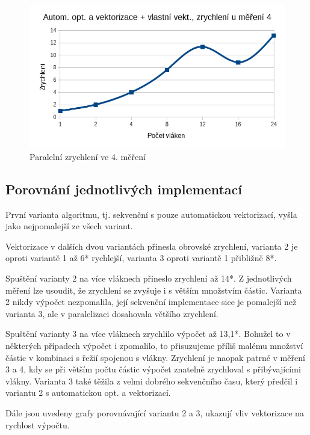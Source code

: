 \documentclass[12pt]{article}
\begin{document}
\begin{figure}[H]
  \begin{center}
     \includegraphics[width=12cm]{images/ssef4acc.png}
    \caption{Paralelní zrychlení ve 4. měření} 
  \end{center}
\end{figure}

\subsection{Porovnání jednotlivých implementací}
První varianta algoritmu, tj. sekvenční s pouze automatickou vektorizací, vyšla jako nejpomalejší ze všech variant.

Vektorizace v dalších dvou variantách přinesla obrovské zrychlení, varianta 2 je oproti variantě 1 až 6* rychlejší, varianta 3 oproti variantě 1 přibližně 8*.

Spuštění varianty 2 na více vláknech přineslo zrychlení až 14*. Z jednotlivých měření lze usoudit, že zrychlení se zvyšuje i s větším množstvím částic.
Varianta 2 nikdy výpočet nezpomalila, její sekvenční implementace sice je pomalejší než varianta 3, ale v paralelizaci dosahovala většího zrychlení.

Spuštění varianty 3 na více vláknech zrychlilo výpočet až 13,1*.
Bohužel to v některých případech výpočet i zpomalilo, to přisuzujeme příliš malému množství částic v kombinaci s řežií spojenou s vlákny.
Zrychlení je naopak patrné v měření 3 a 4, kdy se při větším počtu částic výpočet znatelně zrychloval s přibývajícími vlákny.
Varianta 3 také těžila z velmi dobrého sekvenčního času, který předčil i variantu 2 s automatickou opt. a vektorizací.

Dále jsou uvedeny grafy porovnávající variantu 2 a 3, ukazují vliv vektorizace na rychlost výpočtu.
\end{document}
